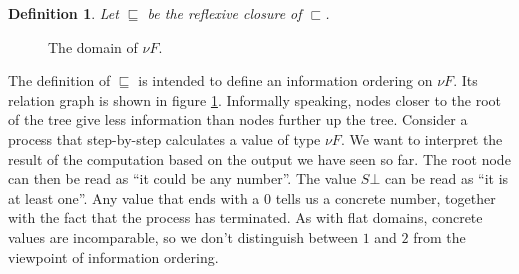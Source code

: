 \documentclass[a4paper]{article}
\newtheorem{defPartialOrderNuF}[defNuF]{Definition}
\begin{document}
\begin{defPartialOrderNuF}

Let $\sqsubseteq$ be the reflexive closure of $\sqsubset$.

\end{defPartialOrderNuF}


\begin{figure}
\begin{center}
\end{center}
\caption{The domain of $\nu F$.}
\label{fig:DomainOfNuF}
\end{figure}

The definition of $\sqsubseteq$ is intended to define an information ordering
on $\nu F$.  Its relation graph is shown in figure \ref{fig:DomainOfNuF}.
Informally speaking, nodes closer to the root of the tree give less information
than nodes further up the tree.  Consider a process that step-by-step
calculates a value of type $\nu F$.  We want to interpret the result of the
computation based on the output we have seen so far.  The root node can then be
read as ``it could be any number''.  The value $S\bot$ can be read as ``it is
at least one''.  Any value that ends with a $0$ tells us a concrete number,
together with the fact that the process has terminated.  As with flat domains,
concrete values are incomparable, so we don't distinguish between $1$ and $2$
from the viewpoint of information ordering.
\end{document}
